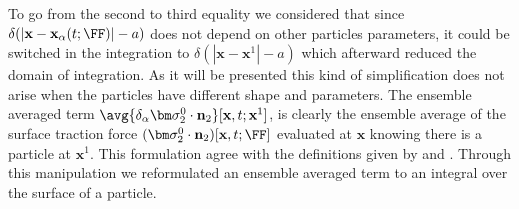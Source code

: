 To go from the second to third equality we considered that since $\delta(|\textbf{x} - \textbf{x}_{\alpha}(t;\FF)|-a)$ does not depend on other particles parameters, it could be switched in the integration to $\delta(|\textbf{x} - \textbf{x}^1|-a)$ which afterward reduced the domain of integration. 
As it will be presented this kind of simplification does not arise when the particles have different shape and parameters.  
The ensemble averaged term $\avg{\delta_\alpha \bm\sigma_2^0\cdot \textbf{n}_2}
[\textbf{x},t;\textbf{x}^1]$, is clearly the ensemble average of the surface traction force $(\bm\sigma_2^0\cdot \textbf{n}_2)[\textbf{x},t;\FF]$ evaluated at $\textbf{x}$ knowing there is a particle at $\textbf{x}^1$.
This formulation agree with the definitions given by \citet{hinch1977averaged} and \citet{zhang1994averaged}. 
Through this manipulation we reformulated an ensemble averaged term to an integral over the surface of a particle. 

